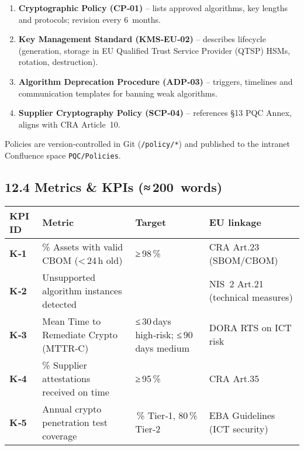 \documentclass[
  english,
]{article}
\providecommand{\tightlist}{%
  \setlength{\itemsep}{0pt}\setlength{\parskip}{0pt}}
\begin{document}
\begin{enumerate}
\def\labelenumi{\arabic{enumi}.}
\tightlist
\item
  \textbf{Cryptographic Policy (CP‑01)} -- lists approved algorithms,
  key lengths and protocols; revision every 6~months.
\item
  \textbf{Key Management Standard (KMS‑EU‑02)} -- describes lifecycle
  (generation, storage in EU Qualified Trust Service Provider (QTSP)
  HSMs, rotation, destruction).
\item
  \textbf{Algorithm Deprecation Procedure (ADP‑03)} -- triggers,
  timelines and communication templates for banning weak algorithms.
\item
  \textbf{Supplier Cryptography Policy (SCP‑04)} -- references §13 PQC
  Annex, aligns with CRA Article~10.
\end{enumerate}

Policies are version‑controlled in Git (\texttt{/policy/*}) and
published to the intranet Confluence space \texttt{PQC/Policies}.

\subsection{12.4 Metrics \& KPIs
(≈\,200~words)}\label{metrics-kpis-200-words}

\begin{longtable}[]{@{}
  >{\raggedright\arraybackslash}p{}
  >{\raggedright\arraybackslash}p{}
  >{\raggedright\arraybackslash}p{}
  >{\raggedright\arraybackslash}p{}@{}}
\toprule\noalign{}
\begin{minipage}[b]{\linewidth}\raggedright
KPI ID
\end{minipage} & \begin{minipage}[b]{\linewidth}\raggedright
Metric
\end{minipage} & \begin{minipage}[b]{\linewidth}\raggedright
Target
\end{minipage} & \begin{minipage}[b]{\linewidth}\raggedright
EU linkage
\end{minipage} \\
\midrule\noalign{}
\endhead
\bottomrule\noalign{}
\endlastfoot
\textbf{K‑1} & \% Assets with valid CBOM (\textless\,24\,h old) &
≥\,98\,\% & CRA Art.23 (SBOM/CBOM) \\
\textbf{K‑2} & Unsupported algorithm instances detected & 0 & NIS~2
Art.21 (technical measures) \\
\textbf{K‑3} & Mean Time to Remediate Crypto (MTTR‑C) & ≤\,30\,days
high‑risk; ≤\,90\,days medium & DORA RTS on ICT risk \\
\textbf{K‑4} & \% Supplier attestations received on time & ≥\,95\,\% &
CRA Art.35 \\
\textbf{K‑5} & Annual crypto penetration test coverage & 100\,\% Tier‑1,
80\,\% Tier‑2 & EBA Guidelines (ICT security) \\
\end{longtable}
\end{document}
